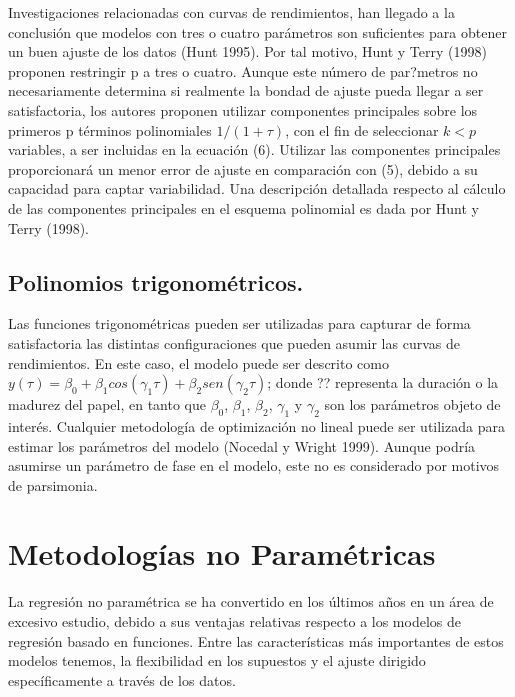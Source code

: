\hspace*{0.4 cm}Investigaciones relacionadas con curvas de rendimientos, han llegado a
la conclusi\'on que modelos con tres o cuatro par\'ametros son suficientes
para obtener un buen ajuste de los datos (Hunt 1995). Por tal motivo,
Hunt y Terry (1998) proponen restringir p a tres o cuatro. Aunque este
n\'umero de par?metros no necesariamente determina si realmente la
bondad de ajuste pueda llegar a ser satisfactoria, los autores proponen
utilizar componentes principales sobre los primeros p t\'erminos
polinomiales $1/(1 + \tau)$, con el fin de seleccionar $k<p$ variables, a ser
incluidas en la ecuaci\'on (6). Utilizar las componentes principales
proporcionar\'a un menor error de ajuste en comparaci\'on con (5),
debido a su capacidad para captar variabilidad. Una descripci\'on
detallada respecto al c\'alculo de las componentes principales en el
esquema polinomial es dada por Hunt y Terry (1998).

\subsection{Polinomios trigonom\'etricos.\\}



\hspace*{0.4 cm} Las funciones trigonom\'etricas pueden ser utilizadas para capturar de
forma satisfactoria las distintas configuraciones que pueden asumir las
curvas de rendimientos. En este caso, el modelo puede ser descrito como
$y(\tau) = \beta_{0} + \beta_{1}cos(\gamma_{1}\tau) + \beta_{2}sen(\gamma_{2}\tau)$; donde ?? representa la duraci\'on o la
madurez del papel, en tanto que $\beta_{0}$, $\beta_{1}$, $\beta_{2}$, $\gamma_{1}$ y $\gamma_{2}$ son los par\'ametros
objeto de inter\'es. Cualquier metodolog\'ia de optimizaci\'on no lineal puede
ser utilizada para estimar los par\'ametros del modelo (Nocedal y Wright
1999). Aunque podr\'ia asumirse un par\'ametro de fase en el modelo, este
no es considerado por motivos de parsimonia.

\section{Metodolog\'ias no Param\'etricas}

\hspace*{0.4 cm} La regresi\'on no param\'etrica se ha convertido en los \'ultimos a\~nos en un
\'area de excesivo estudio, debido a sus ventajas relativas respecto a los
modelos de regresi\'on basado en funciones. Entre las caracter\'isticas m\'as
importantes de estos modelos tenemos, la flexibilidad en los supuestos y
el ajuste dirigido espec\'ificamente a trav\'es de los datos.


